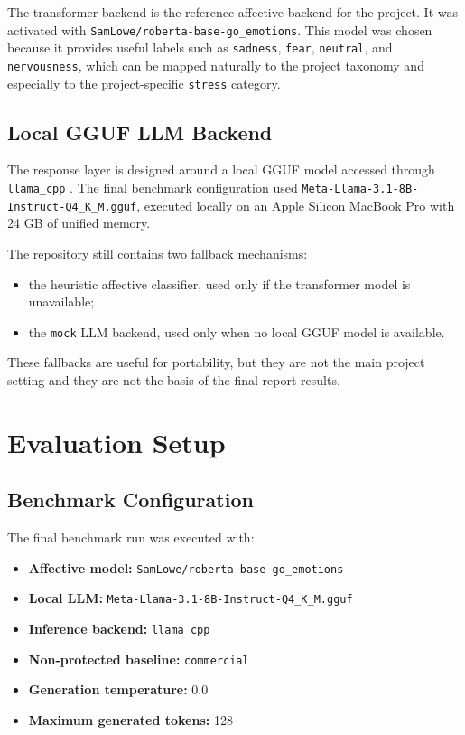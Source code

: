 \documentclass[11pt,a4paper]{article}
\newcommand{\code}[1]{\texttt{#1}}
\begin{document}
The transformer backend is the reference affective backend for the project. It was activated
with \code{SamLowe/roberta-base-go\_emotions}. This model was chosen because it
provides useful labels such as \code{sadness}, \code{fear}, \code{neutral}, and
\code{nervousness}, which can be mapped naturally to the project taxonomy and especially to
the project-specific \code{stress} category.

\subsection{Local GGUF LLM Backend}

The response layer is designed around a local GGUF model accessed through
\code{llama\_cpp} \cite{llamacpp}. The final benchmark configuration used
\code{Meta-Llama-3.1-8B-Instruct-Q4\_K\_M.gguf}, executed locally on an Apple Silicon
MacBook Pro with 24 GB of unified memory.

The repository still contains two fallback mechanisms:

\begin{itemize}[leftmargin=1.8em]
\item the heuristic affective classifier, used only if the transformer model is unavailable;
\item the \code{mock} LLM backend, used only when no local GGUF model is available.
\end{itemize}

These fallbacks are useful for portability, but they are not the main project setting and
they are not the basis of the final report results.

\section{Evaluation Setup}

\subsection{Benchmark Configuration}

The final benchmark run was executed with:

\begin{itemize}[leftmargin=1.8em]
\item \textbf{Affective model:} \code{SamLowe/roberta-base-go\_emotions}
\item \textbf{Local LLM:} \code{Meta-Llama-3.1-8B-Instruct-Q4\_K\_M.gguf}
\item \textbf{Inference backend:} \code{llama\_cpp}
\item \textbf{Non-protected baseline:} \code{commercial}
\item \textbf{Generation temperature:} 0.0
\item \textbf{Maximum generated tokens:} 128
\end{itemize}
\end{document}
